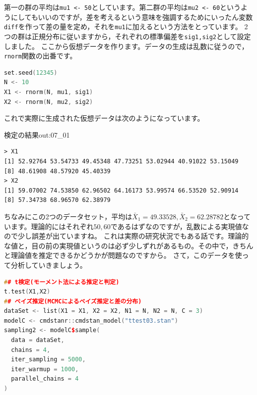 \documentclass{ltjsbook}
\begin{document}
第一の群の平均は\verb|mu1 <- 50|としています。第二群の平均は\verb|mu2 <- 60|というようにしてもいいのですが，差を考えるという意味を強調するためにいったん変数\verb|diff|を作って差の量を定め，それを\verb|mu1|に加えるという方法をとっています。
2つの群は正規分布に従いますから，それぞれの標準偏差を\verb|sig1,sig2|として設定しました。
ここから仮想データを作ります。データの生成は乱数に従うので，\verb|rnorm|関数の出番です。
\begin{lstlisting}[language=c++,label={code:07_05},caption={仮想データの生成}]
set.seed(12345)
N <- 10
X1 <- rnorm(N, mu1, sig1)
X2 <- rnorm(N, mu2, sig2)
\end{lstlisting}
これで実際に生成された仮想データは次のようになっています。
\begin{Rscreen}{検定の結果}{out:07_01}
	\begin{verbatim}
> X1
[1] 52.92764 53.54733 49.45348 47.73251 53.02944 40.91022 53.15049 
[8] 48.61908 48.57920 45.40339
> X2
[1] 59.07002 74.53850 62.96502 64.16173 53.99574 66.53520 52.90914 
[8] 57.34738 68.96570 62.38979
\end{verbatim}
\end{Rscreen}
ちなみにこの2つのデータセット，平均は$\bar{X}_1=49.33528,\bar{X}_2=62.28782$となっています。理論的にはそれぞれ$50,60$であるはずなのですが，乱数による実現値なので少し誤差が出ていますね。
これは実際の研究状況でもある話です。理論的な値と，目の前の実現値というのは必ず少しずれがあるもの。その中で，きちんと理論値を推定できるかどうかが問題なのですから。
さて，このデータを使って分析していきましょう。
\begin{lstlisting}[language=c++,label={code:07_06},caption={パラメータリカバリ・検証}]
## t検定(モーメント法による推定と判定)
t.test(X1,X2)
## ベイズ推定(MCMCによるベイズ推定と差の分布)
dataSet <- list(X1 = X1, X2 = X2, N1 = N, N2 = N, C = 3)
modelC <- cmdstanr::cmdstan_model("ttest03.stan")
sampling2 <- modelC$sample(
  data = dataSet,
  chains = 4,
  iter_sampling = 5000,
  iter_warmup = 1000,
  parallel_chains = 4
)
\end{lstlisting}
\end{document}
